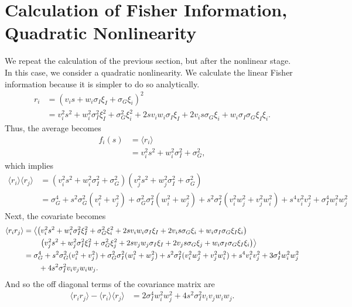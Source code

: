 \documentclass[11pt]{article}
\begin{document}
	\section{Calculation of Fisher Information, Quadratic Nonlinearity}
	We repeat the calculation of the previous section, but after the nonlinear stage. In this case, we consider a quadratic nonlinearity. We calculate the linear Fisher information because it is simpler to do so analytically. 
	\begin{align}
	r_i &= (v_i s + w_i \sigma_I \xi_I + \sigma_G \xi_i)^2 \\
	&= v_i^2 s^2 + w_i^2 \sigma_I^2 \xi_I^2 +  \sigma_G^2 \xi_i^2 + 2s v_i w_i \sigma_I \xi_I + 2 v_i s \sigma_G \xi_i + w_i \sigma_I \sigma_G \xi_I \xi_i.
	\end{align}
	Thus, the average becomes 
	\begin{align}
	f_i(s) &= \langle r_i \rangle \\
	&= v_i^2 s^2 + w_i^2 \sigma_I^2 + \sigma_G^2,
	\end{align}
	which implies 
	\begin{align}
	\langle r_i \rangle  \langle r_j \rangle &= (v_i^2 s^2 + w_i^2 \sigma_I^2 + \sigma_G^2)(v_j^2 s^2 + w_j^2 \sigma_I^2 + \sigma_G^2)\\
	&= \sigma_G^4 + s^2 \sigma_G^2 (v_i^2 + v_j^2)  + \sigma_G^2 \sigma_I^2 (w_i^2 + w_j^2) + s^2 \sigma_I^2 (v_i^2 w_j^2 + v_j^2 w_i^2 ) + s^4 v_i^2 v_j^2+ \sigma_I^4 w_i^2 w_j^2
	\end{align}
	Next, the covariate becomes 
	\begin{align}
	\langle r_i r_j \rangle &= \left\langle \left(v_i^2 s^2 + w_i^2 \sigma_I^2 \xi_I^2 +  \sigma_G^2 \xi_i^2 + 2s v_i w_i \sigma_I \xi_I + 2 v_i s \sigma_G \xi_i + w_i \sigma_I \sigma_G \xi_I \xi_i\right) \right. \notag \\
	& \qquad \left. \left(v_j^2 s^2 + w_j^2 \sigma_I^2 \xi_I^2 +  \sigma_G^2 \xi_j^2 + 2s v_j w_j \sigma_I \xi_I + 2 v_j s \sigma_G \xi_j + w_i \sigma_I \sigma_G \xi_I \xi_i\right)\right\rangle \\
	&= \sigma_G^4 + s^2 \sigma_G^2 (v_i^2 + v_j^2) + \sigma_G^2 \sigma_I^2 (w_i^2 + w_j^2) + s^2 \sigma_I^2 (v_i^2 w_j^2 + v_j^2 w_i^2) + s^4 v_i^2 v_j^2 + 3\sigma_I^4 w_i^2 w_j^2 \notag \\
	& \qquad + 4s^2 \sigma_I^2 v_i v_j w_i w_j.
	\end{align}
	And so the off diagonal terms of the covariance matrix are 
	\begin{align}
	\langle r_i r_j \rangle - \langle r_i \rangle \langle r_j \rangle &= 2 \sigma_I^4 w_i^2 w_j^2 + 4s^2 \sigma_I^2 v_i v_j w_i w_j.
	\end{align}
\end{document}
